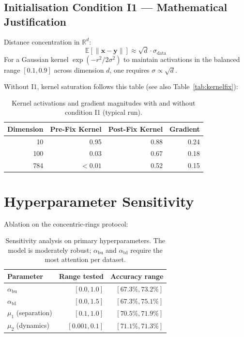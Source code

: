 \documentclass[11pt,a4paper]{article}
\begin{document}
\subsection{Initialisation Condition I1 --- Mathematical Justification}

Distance concentration in $\mathbb{R}^d$:
\begin{equation}
  \mathbb{E}[\|\mathbf{x} - \mathbf{y}\|] \approx \sqrt{d}\cdot\sigma_{\mathrm{data}}
\end{equation}
For a Gaussian kernel $\exp(-r^2/2\sigma^2)$ to maintain activations in the balanced range
$[0.1, 0.9]$ across dimension $d$, one requires $\sigma \propto \sqrt{d}$.

Without I1, kernel saturation follows this table (see also Table~\ref{tab:kernelfix}):

\begin{table}[h]
\centering
\begin{tabular}{rrrr}
\toprule
\textbf{Dimension} & \textbf{Pre-Fix Kernel} & \textbf{Post-Fix Kernel} & \textbf{Gradient} \\
\midrule
10  & 0.95    & 0.88 & 0.24 \\
100 & 0.03    & 0.67 & 0.18 \\
784 & $<0.01$ & 0.52 & 0.15 \\
\bottomrule
\end{tabular}
\caption{Kernel activations and gradient magnitudes with and without condition I1 (typical run).}
\end{table}

\section{Hyperparameter Sensitivity}

Ablation on the concentric-rings protocol:

\begin{table}[h]
\centering
\begin{tabular}{lrr}
\toprule
\textbf{Parameter} & \textbf{Range tested} & \textbf{Accuracy range} \\
\midrule
$\alpha_{\mathrm{bu}}$ & $[0.0, 1.0]$ & $[67.3\%, 73.2\%]$ \\
$\alpha_{\mathrm{td}}$ & $[0.0, 1.5]$ & $[67.3\%, 75.1\%]$ \\
$\mu_1$ (separation)   & $[0.1, 1.0]$ & $[70.5\%, 71.9\%]$ \\
$\mu_2$ (dynamics)     & $[0.001, 0.1]$ & $[71.1\%, 71.3\%]$ \\
\bottomrule
\end{tabular}
\caption{Sensitivity analysis on primary hyperparameters.  The model is moderately robust;
$\alpha_{\mathrm{bu}}$ and $\alpha_{\mathrm{td}}$ require the most attention per dataset.}
\end{table}
\end{document}

